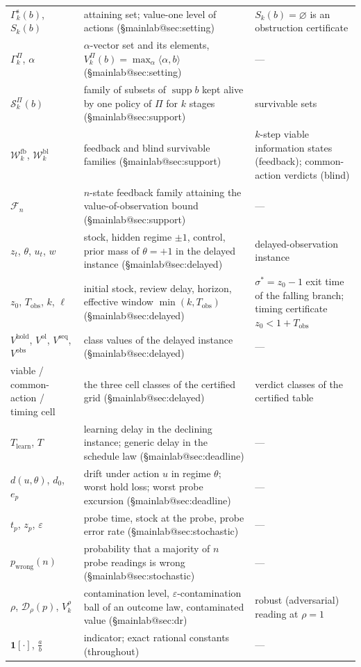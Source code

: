 \documentclass[11pt,a4paper]{article}
\makeatletter
\theoremstyle{plain}
\theoremstyle{definition}
\theoremstyle{remark}
\newcommand{\calS}{\mathcal{S}}
\newcommand{\calW}{\mathcal{W}}
\newcommand{\calD}{\mathcal{D}}
\newcommand{\Wfb}{\calW^{\mathrm{fb}}}
\newcommand{\Wbl}{\calW^{\mathrm{bl}}}
\newcommand{\supp}{\operatorname{supp}}
\newcommand{\hold}{\mathrm{hold}}
\newcommand{\ol}{\mathrm{ol}}
\newcommand{\seq}{\mathrm{seq}}
\newcommand{\obs}{\mathrm{obs}}
\newcommand{\Tobs}{T_{\mathrm{obs}}}
\newcommand{\Tl}{T_{\mathrm{learn}}}
\newcommand{\ind}[1]{\mathbf{1}[#1]}
\newcommand{\tfr}[2]{\tfrac{#1}{#2}}
\newcommand{\mref}[1]{\csname mainlab@#1\endcsname}
\makeatother
\begin{document}
{\begin{longtable}{@{}>{\raggedright\arraybackslash}p{}>{\raggedright\arraybackslash}p{}>{\raggedright\arraybackslash}p{}@{}}
$\Gamma^{\mathrm s}_k(b)$, $S_k(b)$ & attaining set; value-one level of actions (\S\mref{sec:setting}) & $S_k(b)=\varnothing$ is an obstruction certificate\\
$\Gamma^{\Pi}_k$, $\alpha$ & $\alpha$-vector set and its elements, $V^{\Pi}_k(b)=\max_{\alpha}\langle\alpha,b\rangle$ (\S\mref{sec:setting}) & ---\\
$\calS^{\Pi}_k(b)$ & family of subsets of $\supp b$ kept alive by one policy of $\Pi$ for $k$ stages (\S\mref{sec:support}) & survivable sets\\
$\Wfb_k$, $\Wbl_k$ & feedback and blind survivable families (\S\mref{sec:support}) & $k$-step viable information states (feedback); common-action verdicts (blind)\\
$\mathcal F_n$ & $n$-state feedback family attaining the value-of-observation bound (\S\mref{sec:support}) & ---\\
$z_t$, $\theta$, $u_t$, $w$ & stock, hidden regime $\pm1$, control, prior mass of $\theta=+1$ in the delayed instance (\S\mref{sec:delayed}) & delayed-observation instance\\
$z_0$, $\Tobs$, $k$, $\ell$ & initial stock, review delay, horizon, effective window $\min(k,\Tobs)$ (\S\mref{sec:delayed}) & $\sigma^{*}=z_0-1$ exit time of the falling branch; timing certificate $z_0<1+\Tobs$\\
$V^{\hold}$, $V^{\ol}$, $V^{\seq}$, $V^{\obs}$ & class values of the delayed instance (\S\mref{sec:delayed}) & ---\\
viable / common-action / timing cell & the three cell classes of the certified grid (\S\mref{sec:delayed}) & verdict classes of the certified table\\
$\Tl$, $T$ & learning delay in the declining instance; generic delay in the schedule law (\S\mref{sec:deadline}) & ---\\
$d(u,\theta)$, $d_0$, $e_p$ & drift under action $u$ in regime $\theta$; worst hold loss; worst probe excursion (\S\mref{sec:deadline}) & ---\\
$t_p$, $z_p$, $\varepsilon$ & probe time, stock at the probe, probe error rate (\S\mref{sec:stochastic}) & ---\\
$p_{\mathrm{wrong}}(n)$ & probability that a majority of $n$ probe readings is wrong (\S\mref{sec:stochastic}) & ---\\
$\rho$, $\calD_\rho(p)$, $V^{\rho}_k$ & contamination level, $\varepsilon$-contamination ball of an outcome law, contaminated value (\S\mref{sec:dr}) & robust (adversarial) reading at $\rho=1$\\
$\ind{\cdot}$, $\tfr{a}{b}$ & indicator; exact rational constants (throughout) & ---\\
\end{longtable}}
\end{document}
